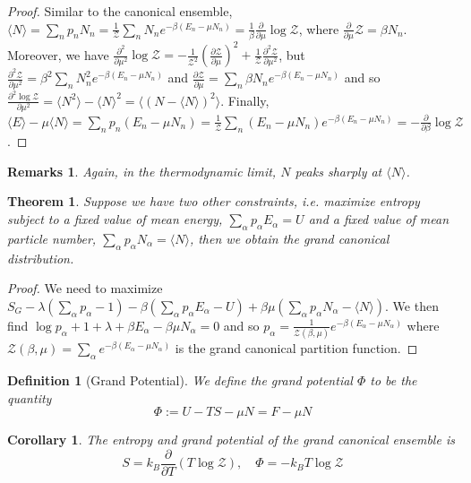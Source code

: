 \documentclass[a4paper]{article}
\newtheorem{remarks}{Remarks}[section]
\theoremstyle{new}
\newtheorem{defi}{Definition}[section]
\newtheorem{thm}{Theorem}[section]
\newtheorem{cor}{Corollary}[section]
\begin{document}
\begin{proof}
Similar to the canonical ensemble, $\langle N\rangle=\sum_np_nN_n=\frac{1}{\mathcal{Z}}\sum_nN_ne^{-\beta (E_n-\mu N_n)}=\frac{1}{\beta}\frac{\partial}{\partial\mu}\log\mathcal{Z}$, where $\frac{\partial}{\partial\mu}\mathcal{Z}=\beta N_n$. Moreover, we have
$\frac{\partial^2}{\partial\mu^2}\log \mathcal{Z}=-\frac{1}{\mathcal{Z}^2}(\frac{\partial\mathcal{Z}}{\partial\mu})^2+\frac{1}{\mathcal{Z}}\frac{\partial^2\mathcal{Z}}{\partial\mu^2}$, but $\frac{\partial^2\mathcal{Z}}{\partial\mu^2}=\beta^2\sum_nN_n^2e^{-\beta (E_n-\mu N_n)}$ and $\frac{\partial \mathcal{Z}}{\partial\mu}=\sum_n\beta N_ne^{-\beta (E_n-\mu N_n)}$ and so $\frac{\partial^2\log \mathcal{Z}}{\partial\mu^2}=\langle N^2\rangle-\langle N\rangle^2=\langle (N-\langle N\rangle)^2\rangle$. Finally, 
$\langle E\rangle-\mu\langle N\rangle=\sum_np_n(E_n-\mu N_n)=\frac{1}{\mathcal{Z}}\sum_n(E_n-\mu N_n)e^{-\beta(E_n-\mu N_n)}=-\frac{\partial}{\partial\beta}\log\mathcal{Z}$. 
\end{proof}
\begin{remarks}
Again, in the thermodynamic limit, $N$ peaks sharply at $\langle N\rangle$.
\end{remarks}
\begin{thm}
Suppose we have two other constraints, i.e. maximize entropy subject to a fixed value of mean energy, $\sum_\alpha p_\alpha E_\alpha=U$ and a fixed value of mean particle number, $\sum_\alpha p_\alpha N_\alpha=\langle N\rangle$, then we obtain the grand canonical distribution.
\end{thm}
\begin{proof}
We need to maximize $S_G-\lambda(\sum_\alpha p_\alpha-1)-\beta(\sum_\alpha p_\alpha E_\alpha-U)+\beta\mu(\sum_\alpha p_\alpha N_\alpha-\langle N\rangle)$. We then find $\log p_\alpha+1+\lambda+\beta E_\alpha-\beta\mu N_\alpha=0$ and so $p_\alpha=\frac{1}{\mathcal{Z}(\beta,\mu)}e^{-\beta(E_\alpha-\mu N_\alpha)}$ where $\mathcal{Z}(\beta,\mu)=\sum_\alpha e^{-\beta(E_\alpha-\mu N_\alpha)}$ is the grand canonical partition function.
\end{proof}
\begin{defi}[Grand Potential]
We define the grand potential $\Phi$ to be the quantity
\begin{equation}
\Phi:=U-TS-\mu N=F-\mu N\label{grandpotential}
\end{equation}
\end{defi}
\begin{cor}
The entropy and grand potential of the grand canonical ensemble is 
\begin{equation}
S=k_B\frac{\partial}{\partial T}(T\log\mathcal{Z}),\quad\Phi=-k_BT\log\mathcal{Z}\label{grandcanonical2}
\end{equation}
\end{cor}
\end{document}
